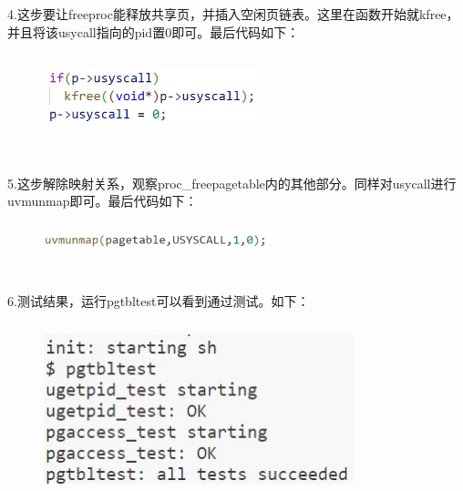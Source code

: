 \documentclass[12pt]{article}
\begin{document}
4.这步要让freeproc能释放共享页，并插入空闲页链表。这里在函数开始就kfree，并且将该usycall指向的pid置0即可。最后代码如下：
\begin{figure}[h]
	\centering
	\includegraphics[height=2.5cm,width=6.25cm]{lab3-4.jpg}
\end{figure}\\
\hspace*{2em}5.这步解除映射关系，观察proc\_freepagetable内的其他部分。同样对usycall进行uvmunmap即可。最后代码如下：
\begin{figure}[h]
	\centering
	\includegraphics[height=1cm,width=6.5cm]{lab3-5.jpg}
\end{figure}\\
\hspace*{2em}6.测试结果，运行pgtbltest可以看到通过测试。如下：\\
\begin{figure}[H]
	\centering
	\includegraphics[height=5cm,width=9cm]{lab3-6.jpg}
\end{figure}
\end{document}
